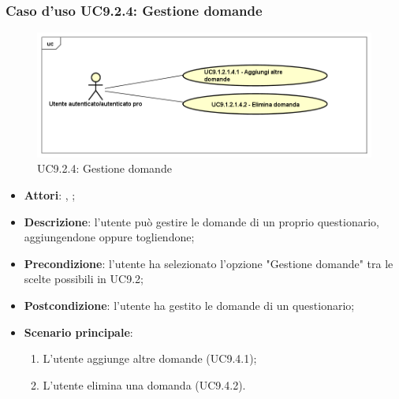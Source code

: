 		\subsubsection{Caso d'uso UC9.2.4: Gestione domande}
		\label{UC9.2.4}
		\begin{figure}[h]
			\centering
			\includegraphics[scale=0.5,keepaspectratio]{UML/UC9_2_4.png}
			\caption{UC9.2.4: Gestione domande}
		\end{figure}
		\FloatBarrier
		\begin{itemize}
			\item \textbf{Attori}: \uau, \uaupro;
			\item \textbf{Descrizione}: l'utente può gestire le domande di un proprio questionario, aggiungendone oppure togliendone;
			\item \textbf{Precondizione}: l'utente ha selezionato l'opzione "Gestione domande" tra le scelte possibili in UC9.2;
			\item \textbf{Postcondizione}: l'utente ha gestito le domande di un questionario;
			\item \textbf{Scenario principale}: 
			\begin{enumerate}
				\item L'utente aggiunge altre domande (UC9.4.1);
				\item L'utente elimina una domanda (UC9.4.2).
			\end{enumerate}
		\end{itemize}
		
